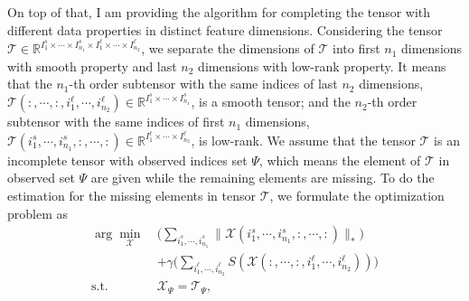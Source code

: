 \documentclass[12pt, draftcls, onecolumn]{IEEEtran}
\theoremstyle{plain}
\theoremstyle{definition}
\theoremstyle{remark}
\begin{document}
On top of that, I am providing the algorithm for completing the tensor with different data properties in distinct feature dimensions.
Considering the tensor $\mathcal T\in\mathbb{R}^{I^s_{1}\times\cdots\times I^s_{n_1}\times I^{\ell}_{1}\times\cdots\times I^{\ell}_{n_2}}$, we separate the dimensions of $\mathcal T$ into first $n_1$ dimensions with smooth property and last $n_2$ dimensions with low-rank property.
It means that the $n_1$-th order subtensor with the same indices of last $n_2$ dimensions, $\mathcal{T}(:,\cdots,:,i^{\ell}_{1},\cdots,i^{\ell}_{n_2})\in\mathbb{R}^{I^s_{1}\times\cdots\times I^s_{n_1}}$, is a smooth tensor;
and the $n_2$-th order subtensor with the same indices of first $n_1$ dimensions, $\mathcal{T}(i^s_{1},\cdots,i^s_{n_1},:,\cdots,:)\in\mathbb{R}^{I^{\ell}_{1}\times\cdots\times I^{\ell}_{n_2}}$, is low-rank.
We assume that the tensor $\mathcal{T}$ is an incomplete tensor with observed indices set $\Psi$, which means the element of $\mathcal{T}$ in observed set $\Psi$ are given while the remaining elements are missing. 
To do the estimation for the missing elements in tensor $\mathcal{T}$, we formulate the optimization problem as
\begin{equation}
\label{hybrid_tensor_completion_problem}
\begin{aligned}
    \arg\min_{\mathcal{X}}\ & \bigg(\sum_{i^s_{1},\cdots,i^s_{n_1}}\lVert \mathcal{X}(i^s_{1},\cdots,i^s_{n_1},:,\cdots,:)\rVert_*\bigg)\\
    &+\gamma \bigg(\sum_{i^{\ell}_{1},\cdots,i^{\ell}_{n_2}}{S}\left(\mathcal{X}(:,\cdots,:,i^{\ell}_{1},\cdots,i^{\ell}_{n_2})\right)\bigg)\\
    \text{s.t. }
                & \mathcal{X}_\Psi = \mathcal{T}_\Psi,\\
\end{aligned}
\end{equation}
\end{document}
